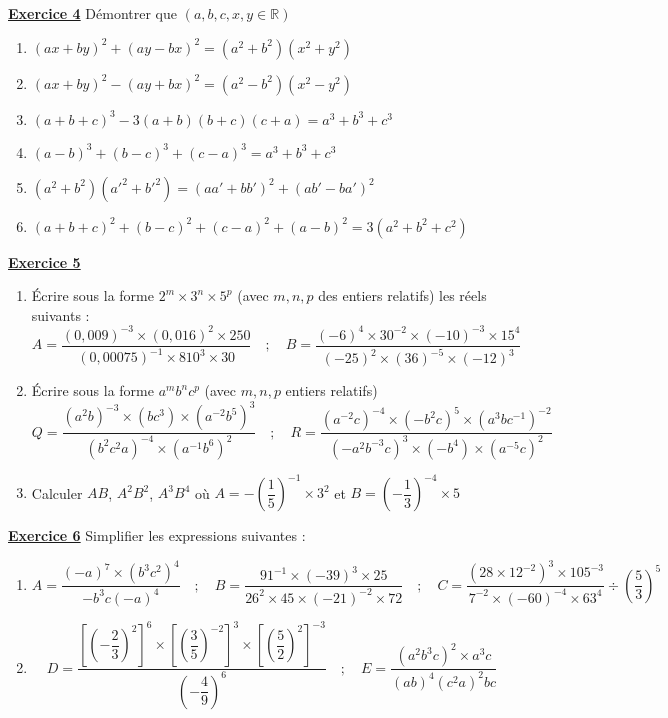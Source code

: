 \documentclass[12pt,a4paper]{article}
\newcommand{\exo}[1]{%
        \textbf{\underline{Exercice #1}}
}
\begin{document}
\exo{4}Démontrer que $(a, b, c, x, y \in \mathbb{R})$
\begin{enumerate}
\item \( (ax + by)^2 + (ay - bx)^2 = (a^2 + b^2)(x^2 + y^2) \)
\item \( (ax + by)^2 - (ay + bx)^2 = (a^2 - b^2)(x^2 - y^2) \)
\item \( (a + b + c)^3 - 3(a + b)(b + c)(c + a) = a^3 + b^3 + c^3 \)
\item \( (a - b)^3 + (b - c)^3 + (c - a)^3 = a^3 + b^3 + c^3 \)
\item \( (a^2 + b^2)(a'^2 + b'^2) = (aa' + bb')^2 + (ab' - ba')^2 \)
\item \( (a + b + c)^2 + (b - c)^2 + (c - a)^2 + (a - b)^2 = 3(a^2 + b^2 + c^2) \)
\end{enumerate}
\exo{5} 
\begin{enumerate}
\item Écrire sous la forme $2^m \times 3^n \times 5^p$ (avec $m, n, p$ des entiers relatifs) les réels suivants :
  \[
  A = \dfrac{(0{,}009)^{-3} \times (0{,}016)^2 \times 250}{(0{,}00075)^{-1} \times 810^3 \times 30}
  \quad ; \quad
  B = \dfrac{(-6)^4 \times 30^{-2} \times (-10)^{-3} \times 15^4}{(-25)^2 \times (36)^{-5} \times (-12)^3}
  \]
\item Écrire sous la forme $a^m b^n c^p$ (avec $m, n, p$ entiers relatifs)
  \[
  Q = \dfrac{(a^2 b)^{-3} \times (b c^3) \times (a^{-2} b^5)^3}{(b^2 c^2 a)^{-4} \times (a^{-1} b^6)^2}
  \quad ; \quad
  R = \dfrac{(a^{-2} c)^{-4} \times (-b^2 c)^5 \times (a^3 b c^{-1})^{-2}}{(-a^2 b^{-3} c)^3 \times (-b^4) \times (a^{-5} c)^2}
  \]
\item Calculer $AB$, $A^2 B^2$, $A^3 B^4$ où $A = -\left(\dfrac{1}{5}\right)^{-1} \times 3^2$
  et $B = \left(-\dfrac{1}{3}\right)^{-4} \times 5$
\end{enumerate}
\exo{6}Simplifier les expressions suivantes :
\begin{enumerate}
\item \[
A = \dfrac{(-a)^7 \times (b^3 c^2)^4}{-b^3 c (-a)^4}
\quad ; \quad
B = \dfrac{91^{{-1}} \times (-39)^3 \times 25}{26^2 \times 45 \times (-21)^{-2} \times 72}
\quad ; \quad
C = \dfrac{(28 \times 12^{-2})^3 \times 105^{-3}}{7^{-2} \times (-60)^{-4} \times 63^4} \div \left(\dfrac{5}{3}\right)^5
\]
\item \[
D = \dfrac{\left[\left(-\dfrac{2}{3}\right)^2\right]^6 \times \left[\left(\dfrac{3}{5}\right)^{-2}\right]^3 \times \left[\left(\dfrac{5}{2}\right)^2\right]^{-3}}{\left(-\dfrac{4}{9}\right)^6}
\quad ; \quad
E = \dfrac{(a^2 b^3 c)^2 \times a^3 c}{(ab)^4 (c^2 a)^2 b c}
\]
\end{enumerate}
\end{document}
